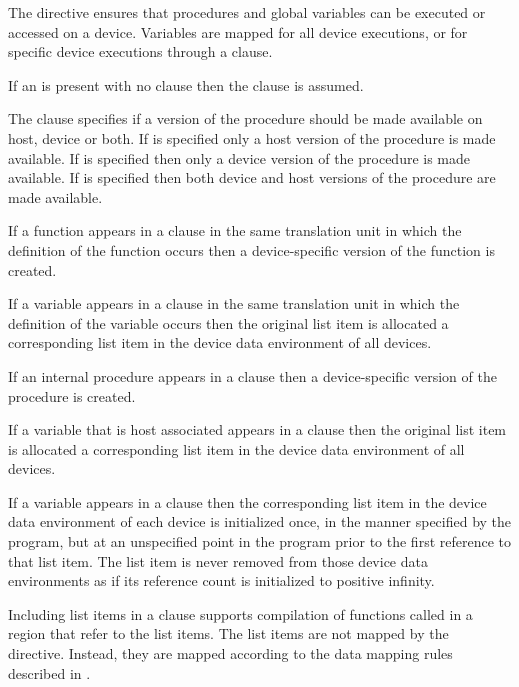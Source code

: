 \descr

The   directive ensures that procedures
and global variables can be executed or accessed on a device.
Variables are mapped for all device executions, or for specific
device executions through a  clause.

If an  is present with no clause then the 
clause is assumed.

The  clause specifies if a version of the procedure should be made
available on host, device or both. If  is specified only a host version
of the procedure is made available.  If  is specified then only a device
version of the procedure is made available.  If  is specified then both
device and host versions of the procedure are made available.

\begin{ccppspecific}
If a function appears in a  clause in the same translation unit in which 
the definition of the function occurs then a device-specific version of the function 
is created.

If a variable appears in a  clause in the same translation unit in which 
the definition of the variable occurs then the original list item is allocated a 
corresponding list item in the device data environment of all devices.

\end{ccppspecific}

\begin{fortranspecific}
If an internal procedure appears in a  clause
then a device-specific version of the procedure is created.

If a variable that is host associated appears in a  clause
then the original list item is allocated a corresponding list item in the
device data environment of all devices.

\end{fortranspecific}

If a variable appears in a  clause then the corresponding list
item in the device data environment of each device is initialized once, in the
manner specified by the program, but at an unspecified point in the program
prior to the first reference to that list item.  The list item is never removed
from those device data environments as if its reference count is initialized to
positive infinity.

Including list items in a  clause supports compilation of
functions called in a  region that refer to the list
items.  The list items are not mapped by the ~
directive.  Instead, they are mapped according to the data mapping
rules described in 
.

